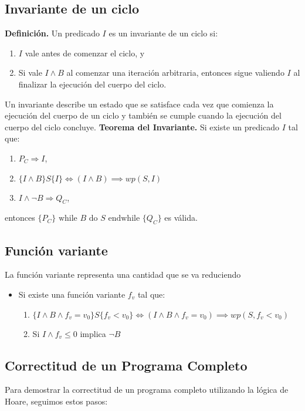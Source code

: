 \documentclass[9pt]{extarticle}  %
\newcommand{\smalltable}{\fontsize{8pt}{10pt}\selectfont}
\begin{document}
\subsection*{\tiny{Invariante de un ciclo}}
\noindent\smalltable
\vspace{-0.2cm}
\textbf{Definición.} Un predicado \( I \) es un invariante de un ciclo si:
\begin{enumerate}
    \item \( I \) vale antes de comenzar el ciclo, y
    \vspace{-0.32cm}
    \item Si vale \( I \land B \) al comenzar una iteración arbitraria, entonces sigue valiendo \( I \) al finalizar la ejecución del cuerpo del ciclo.
\end{enumerate}
\vspace{-0.22cm}
Un invariante describe un estado que se satisface cada vez que comienza la ejecución del cuerpo de un ciclo y también se cumple cuando la ejecución del cuerpo del ciclo concluye.
\vspace{-0.2cm}
\textbf{Teorema del Invariante.} Si existe un predicado \( I \) tal que:
\begin{enumerate}
    \item \( P_C \Rightarrow I \),
    \item $ \{ I \wedge B \} S \{ I \} \iff (I \wedge B) \implies wp(S, I) $
    \item \(I \land \neg B \Rightarrow Q_C\),
\end{enumerate}
entonces \( \{P_C\} \text{ while } B \text{ do } S \text{ endwhile } \{Q_C\} \) es válida.
\subsection*{\tiny{Función variante}}
\noindent\smalltable
La función variante representa una cantidad que se va
reduciendo
\begin{itemize}
    \item {Si existe una función variante \(f_v\) tal que:
\begin{enumerate}\item $ \{ I \wedge B \wedge f_v = v_0 \} S \{ f_v < v_0 \} \iff (I \wedge B \wedge f_v = v_0) \implies wp(S, f_v < v_0) $

    \item Si \(I \land f_v \leq 0\) implica \(\neg B\)
\end{enumerate}}
\end{itemize}
\subsection*{\tiny{Correctitud de un Programa Completo}}
\noindent\smalltable
Para demostrar la correctitud de un programa completo utilizando la lógica de Hoare, seguimos estos pasos:
\end{document}
